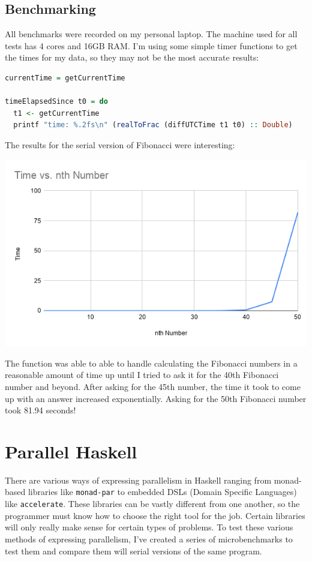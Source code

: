 \documentclass[a4paper, 10pt]{article}
\begin{document}
\subsection{Benchmarking}

All benchmarks were recorded on my personal laptop. The machine used for all tests has 4 cores and 16GB RAM. I'm using some simple timer functions to get the times for my data, so they may not be the most accurate results:

\begin{lstlisting}[language=Haskell, caption=Clock functions]
currentTime = getCurrentTime

timeElapsedSince t0 = do
  t1 <- getCurrentTime
  printf "time: %.2fs\n" (realToFrac (diffUTCTime t1 t0) :: Double)
\end{lstlisting}

The results for the serial version of Fibonacci were interesting:

\includegraphics[scale=0.5]{serialFibData}

The function was able to able to handle calculating the Fibonacci numbers in a reasonable amount of time up until I tried to ask it for the 40th Fibonacci number and beyond. After asking for the 45th number, the time it took to come up with an answer increased exponentially. Asking for the 50th Fibonacci number took 81.94 seconds!

\section{Parallel Haskell}

There are various ways of expressing parallelism in Haskell ranging from monad-based libraries like \lstinline{monad-par} to embedded DSLs (Domain Specific Languages) like \lstinline{accelerate}. These libraries can be vastly different from one another, so the programmer must know how to choose the right tool for the job. Certain libraries will only really make sense for certain types of problems. To test these various methods of expressing parallelism, I've created a series of microbenchmarks to test them and compare them will serial versions of the same program.
\end{document}
